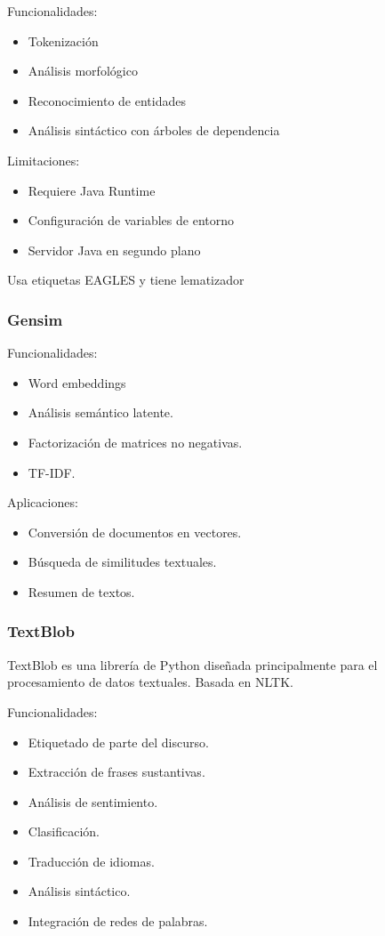\documentclass{report}
\begin{document}
Funcionalidades:

\begin{itemize}
    \item Tokenización
    \item Análisis morfológico
    \item Reconocimiento de entidades
    \item Análisis sintáctico con árboles de dependencia
\end{itemize}

Limitaciones:

\begin{itemize}
    \item Requiere Java Runtime
    \item Configuración de variables de entorno
    \item Servidor Java en segundo plano
\end{itemize}

Usa etiquetas EAGLES y tiene lematizador

\subsubsection{Gensim}
Funcionalidades:
\begin{itemize}
    \item Word embeddings 
    \item Análisis semántico latente.
    \item Factorización de matrices no negativas.
    \item TF-IDF.
\end{itemize}

Aplicaciones:

\begin{itemize}
    \item Conversión de documentos en vectores.
    \item Búsqueda de similitudes textuales.
    \item Resumen de textos.
\end{itemize}

\subsubsection{TextBlob}
TextBlob es una librería de Python diseñada principalmente para el procesamiento de datos textuales. 
Basada en NLTK.

Funcionalidades:

\begin{itemize}
    \item Etiquetado de parte del discurso.
    \item Extracción de frases sustantivas.
    \item Análisis de sentimiento.
    \item Clasificación.
    \item Traducción de idiomas.
    \item Análisis sintáctico.
    \item Integración de redes de palabras.
\end{itemize}
\end{document}
